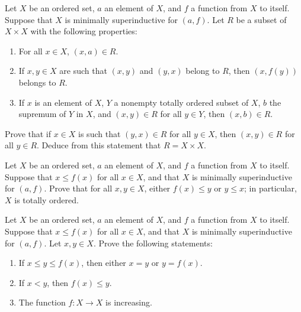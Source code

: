 \documentclass{article}
\begin{document}
\begin{exercise}
  \label{exe:9l6q0c66}
  Let \(X\) be an ordered set, \(a\) an element of \(X\), and \(f\) a
  function from \(X\) to itself.  Suppose that \(X\) is minimally
  superinductive for \((a, f)\).  Let \(R\) be a subset of
  \(X \times X\) with the following properties:
  \begin{enumerate}
  \item \label{item:u0r5igra} For all \(x \in X\), \((x, a) \in R\).
  \item \label{item:3jc58w0r} If \(x, y \in X\) are such that
    \((x, y)\) and \((y, x)\) belong to \(R\), then \((x, f(y))\)
    belongs to \(R\).
  \item \label{item:fh1pwe19} If \(x\) is an element of \(X\), \(Y\) a
    nonempty totally ordered subset of \(X\), \(b\) the supremum of
    \(Y\) in \(X\), and \((x, y) \in R\) for all \(y \in Y\), then
    \((x, b) \in R\).
  \end{enumerate}
  Prove that if \(x \in X\) is such that \((y, x) \in R\) for all
  \(y \in X\), then \((x, y) \in R\) for all \(y \in R\).  Deduce from
  this statement that \(R = X \times X\).
\end{exercise}

\begin{exercise}
  \label{exe:yf8euudc}
  Let \(X\) be an ordered set, \(a\) an element of \(X\), and \(f\) a
  function from \(X\) to itself.  Suppose that \(x \leq f(x)\) for all
  \(x \in X\), and that \(X\) is minimally superinductive for
  \((a, f)\).  Prove that for all \(x,y \in X\), either
  \(f(x) \leq y\) or \(y \leq x\); in particular, \(X\) is totally
  ordered.
\end{exercise}

\begin{exercise}
  \label{exe:htz5ftfy}
  Let \(X\) be an ordered set, \(a\) an element of \(X\), and \(f\) a
  function from \(X\) to itself.  Suppose that \(x \leq f(x)\) for all
  \(x \in X\), and that \(X\) is minimally superinductive for
  \((a, f)\).  Let \(x, y \in X\).  Prove the following statements:
  \begin{enumerate}
  \item If \(x \leq y \leq f(x)\), then either \(x = y\) or
    \(y = f(x)\).
  \item If \(x < y\), then \(f(x) \leq y\).
  \item The function \(f : X \to X\) is increasing.
  \end{enumerate}
\end{exercise}
\end{document}
